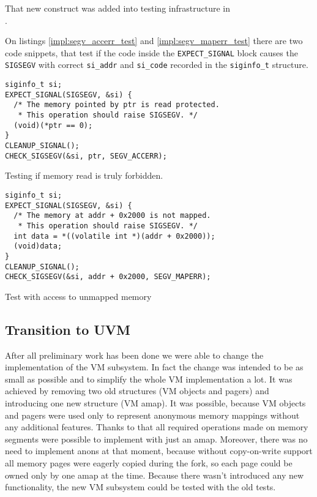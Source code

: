That new construct was added into testing infrastructure in \\
.

On listings \ref{impl:segv_accerr_test} and \ref{impl:segv_maperr_test} there are two code snippets,
that test if the code inside the \texttt{EXPECT_SIGNAL} block causes the \texttt{SIGSEGV} with correct
\texttt{si_addr} and \texttt{si_code} recorded in the \texttt{siginfo_t} structure.

\begin{listing}[h]
  \begin{verbatim}
siginfo_t si;
EXPECT_SIGNAL(SIGSEGV, &si) {
  /* The memory pointed by ptr is read protected.
   * This operation should raise SIGSEGV. */
  (void)(*ptr == 0);
}
CLEANUP_SIGNAL();
CHECK_SIGSEGV(&si, ptr, SEGV_ACCERR);
  \end{verbatim}
  \caption{Testing if memory read is truly forbidden.}
  \label{impl:segv_accerr_test}
\end{listing}

\begin{listing}[h]
  \begin{verbatim}
siginfo_t si;
EXPECT_SIGNAL(SIGSEGV, &si) {
  /* The memory at addr + 0x2000 is not mapped.
   * This operation should raise SIGSEGV. */
  int data = *((volatile int *)(addr + 0x2000));
  (void)data;
}
CLEANUP_SIGNAL();
CHECK_SIGSEGV(&si, addr + 0x2000, SEGV_MAPERR);
  \end{verbatim}
  \caption{Test with access to unmapped memory}
  \label{impl:segv_maperr_test}
\end{listing}

\subsection{Transition to UVM}

After all preliminary work has been done we were able to change the implementation of the VM subsystem.
In fact the change was intended to be as small as possible and to simplify the whole VM implementation a lot.
It was achieved by removing two old structures (VM objects and pagers) and introducing one new structure (VM amap).
It was possible, because VM objects and pagers were used only to represent anonymous memory mappings without any additional features.
Thanks to that all required operations made on memory segments were possible to implement with just an amap.
Moreover, there was no need to implement anons at that moment, because without copy-on-write support all memory pages were eagerly copied during the fork,
so each page could be owned only by one amap at the time.
Because there wasn't introduced any new functionality, the new VM subsystem could be tested with the old tests.

